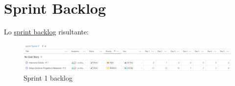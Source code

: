 \section{Sprint Backlog}
Lo \href{https://github.com/orgs/ISIQuiz/projects/3/}{sprint backlog} risultante:
\begin{figure}[H]
    \centering
    \includegraphics[width=\textwidth]{process/Img/Sprint1BL.jpg}
    \caption{Sprint 1 backlog}
    \label{fig:Sprint1}
\end{figure}


